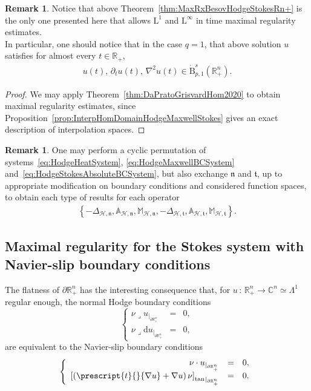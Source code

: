 \documentclass[10pt]{amsart}
\theoremstyle{definition}\newtheorem{defi}[theo]{Definition}\newtheorem{rema}[theo]{Remark}\newtheorem{exam}[theo]{Example}\newtheorem{exem}[theo]{Example}\newtheorem{nota}[theo]{Notation}
\newcommand{\bbA}{\mathbb{A}}
\newcommand{\bbR}{\mathbb{R}}
\newcommand{\bbC}{\mathbb{C}}
\newcommand{\bbM}{\mathbb{M}}
\newcommand{\rmB}{\mathrm{B}}
\newcommand{\rmd}{\mathrm{d}}
\newcommand{\rmL}{\mathrm{L}}
\newcommand{\rtan}{\mathrm{tan}}
\newcommand{\clH}{\mathcal{H}}
\newcommand{\fkn}{\mathfrak{n}}
\newcommand{\fkt}{\mathfrak{t}}
\newcommand{\iprod}{\mathbin{\lrcorner}}
\begin{document}
\begin{rema}
Notice that above Theorem~\ref{thm:MaxRxBesovHodgeStokesRn+} is the only one presented here that allows $\rmL^1$ and $\rmL^\infty$ in time maximal regularity estimates.\\
In particular, one should notice that in the case $q=1$, that above solution $u$ satisfies for almost every $t\in\bbR_+$,
\begin{align*}
u(t),\,\partial_t u(t),\, \nabla^2 u(t) \in \dot{\rmB}^{s}_{p,1}(\bbR^n_+).
\end{align*}
\end{rema}

\begin{proof}
We may apply Theorem~\ref{thm:DaPratoGrisvardHom2020} to obtain maximal regularity estimates, since Proposition~\ref{prop:InterpHomDomainHodgeMaxwellStokes} gives an exact description of interpolation spaces.
\end{proof}

\begin{rema}
One may perform a cyclic permutation of systems~\eqref{eq:HodgeHeatSystem}, \eqref{eq:HodgeMaxwellBCSystem} and~\eqref{eq:HodgeStokesAbsoluteBCSystem}, but also exchange $\fkn$ and $\fkt$, up to appropriate modification on boundary conditions and considered function spaces, to obtain each type of results for each operator
\begin{align*}
\left\{-\Delta_{\clH,\fkn},\bbA_{\clH,\fkn},\bbM_{\clH,\fkn},-\Delta_{\clH,\fkt},\bbA_{\clH,\fkt},\bbM_{\clH,\fkt}\right\} .
\end{align*}
\end{rema}


\subsection{Maximal regularity for the Stokes system with Navier-slip boundary conditions}\label{sec:NaviernoSlipBCRn+}

The flatness of $\partial\bbR^n_+$ has the interesting consequence that, for $u\,:\,\bbR^n_+\longrightarrow\bbC^n\simeq \Lambda^1$ regular enough, the normal Hodge boundary conditions
\begin{equation*}
\left\{
\begin{array}{rcl}
\nu \iprod u_{|_{\partial\bbR^n_+}}& = & 0,\\
\nu\iprod \rmd u_{|_{\partial\bbR^n_+}}& = & 0,
\end{array}
\right.
\end{equation*}
are equivalent to the Navier-slip boundary conditions
\begin{equation}\label{eq:NavierSlipBCs}
\left\{
\begin{array}{rcl}
\nu \cdot u_{|_{\partial\bbR^n_+}}& = & 0,\\
{\left[ \left(\prescript{t}{}{{\nabla u}} + \nabla u\right)\nu \right]_{\rtan}}_{|_{\partial\bbR^n_+}} & = & 0.
\end{array}
\right.
\end{equation}
\end{document}
